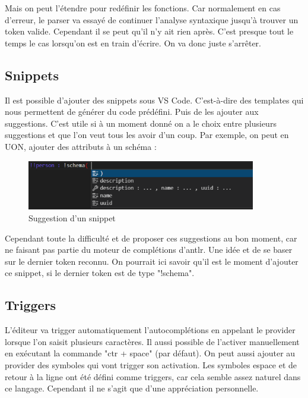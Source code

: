 \documentclass[
    iict, %
    il, %
]{heig-tb}
\begin{document}
Mais on peut l'étendre pour redéfinir les fonctions.
Car normalement en cas d'erreur, le parser va essayé de continuer l'analyse syntaxique jusqu'à trouver un token valide.
Cependant il se peut qu'il n'y ait rien après. C'est presque tout le temps le cas lorsqu'on est en train d'écrire.
On va donc juste s'arrêter.

\subsection{Snippets}
Il est possible d'ajouter des snippets sous VS Code. C'est-à-dire des templates qui nous permettent de générer du code prédéfini. Puis de les ajouter aux suggestions.
C'est utile si à un moment donné on a le choix entre plusieurs suggestions et que l'on veut tous les avoir d'un coup.
Par exemple, on peut en UON, ajouter des attributs à un schéma :

\begin{figure}[!h]
    \begin{center}
        \includegraphics[width=10cm]{assets/figures/snippet-suggestion.png}
    \end{center}
    \caption[Suggestion d'un snippet]{\label{snippet-suggestion} Suggestion d'un snippet}
\end{figure}

Cependant toute la difficulté et de proposer ces suggestions au bon moment, car ne faisant pas partie du moteur de complétions d'antlr. Une idée et de se baser sur le dernier token reconnu. On pourrait ici savoir qu'il est le moment d'ajouter ce snippet, si le dernier token est de type "!schema".

\subsection{Triggers}
L'éditeur va trigger automatiquement l'autocomplétions en appelant le provider lorsque l'on saisit plusieurs caractères. Il aussi possible de l'activer manuellement en exécutant la commande "ctr + space" (par défaut).
On peut aussi ajouter au provider des symboles qui vont trigger son activation. Les symboles espace et de retour à la ligne ont été défini comme triggers, car cela semble assez naturel dans ce langage. Cependant il ne s'agit que d'une appréciation personnelle.
\end{document}
